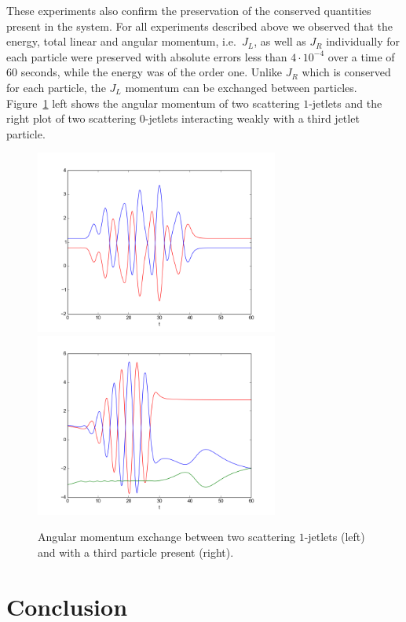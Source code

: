\documentclass[12pt]{amsart}
\begin{document}
These experiments also confirm the preservation of the conserved
quantities present in the system. For all experiments described above
we observed that the energy, total linear and angular momentum,
i.e.~$J_L$, as well as $J_R$ individually for each particle were
preserved with absolute errors less than $4 \cdot 10^{-4}$ over a time
of $60$ seconds, while the energy was of the order one. Unlike $J_R$
which is conserved for each particle, the $J_L$ momentum can be
exchanged between particles. Figure~\ref{fig:angmom-exchange} left shows
the angular momentum of two scattering $1$-jetlets and
the right plot of two scattering $0$-jetlets
interacting weakly with a third jetlet particle.

\begin{figure}[htb]
  \centering
  \includegraphics[width=8cm]{angmom-1jetlets}
  \includegraphics[width=8cm]{angmom-3rd-jetlet}
  \caption{Angular momentum exchange between two scattering
    $1$-jetlets (left) and with a third particle present (right).}
  \label{fig:angmom-exchange}
\end{figure}

\section{Conclusion}
\end{document}
